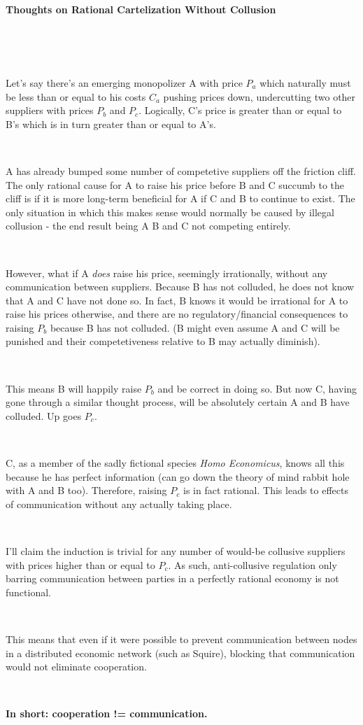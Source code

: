 \documentclass[12pt]{article}
\begin{document}


\paragraph{Thoughts on Rational Cartelization Without Collusion} \ 

\

\noindent Let's say there's an emerging monopolizer A with price $P_a$ which naturally must be less than or equal to his costs $C_a$ pushing prices down, undercutting two other suppliers with prices $P_b$ and $P_c$. Logically, C's price is greater than or equal to B's which is in turn greater than or equal to A's.

\

\noindent A has already bumped some number of competetive suppliers off the friction cliff. The only rational cause for A to raise his price before B and C succumb to the cliff is if it is more long-term beneficial for A if C and B to continue to exist. The only situation in which this makes sense would normally be caused by illegal collusion - the end result being A B and C not competing entirely.

\

\noindent However, what if A \emph{does} raise his price, seemingly irrationally, without any communication between suppliers. Because B has not colluded, he does not know that A and C have not done so. In fact, B knows it would be irrational for A to raise his prices otherwise, and there are no regulatory/financial consequences to raising $P_b$ because B has not colluded. (B might even assume A and C will be punished and their competetiveness relative to B may actually diminish).

\

\noindent This means B will happily raise $P_b$ and be correct in doing so. But now C, having gone through a similar thought process, will be absolutely certain A and B have colluded. Up goes $P_c$.

\

\noindent C, as a member of the sadly fictional species \emph{Homo Economicus}, knows all this because he has perfect information (can go down the theory of mind rabbit hole with A and B too). Therefore, raising $P_c$ is in fact rational. This leads to effects of communication without any actually taking place.

\

\noindent I'll claim the induction is trivial for any number of would-be collusive suppliers with prices higher than or equal to $P_c$. As such, anti-collusive regulation only barring communication between parties in a perfectly rational economy is not functional.

\

\noindent This means that even if it were possible to prevent communication between nodes in a distributed economic network (such as Squire), blocking that communication would not eliminate cooperation.

\

\noindent \textbf{In short: cooperation != communication.}
\end{document}

